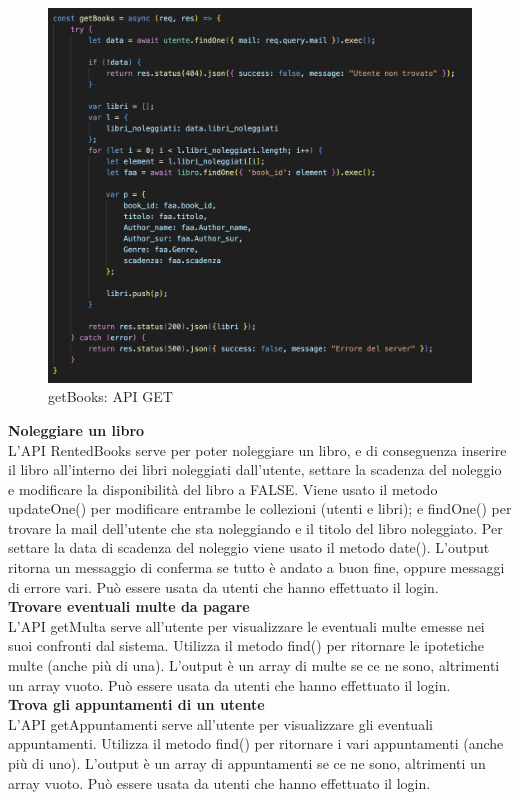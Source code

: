 \documentclass{article}
\begin{document}
\begin{figure}[H]
    \centering
    \includegraphics[width=120mm]{D4/Images/APIGet.png}
    \caption{getBooks: API GET}
\end{figure}

\noindent \textbf{Noleggiare un libro}\\
L'API RentedBooks serve per poter noleggiare un libro, e di conseguenza inserire il libro all'interno dei libri noleggiati dall'utente, settare la scadenza del noleggio e modificare la disponibilità del libro a FALSE.
Viene usato il metodo updateOne() per modificare entrambe le collezioni (utenti e libri); e findOne() per trovare la mail dell'utente che sta noleggiando e il titolo del libro noleggiato.
Per settare la data di scadenza del noleggio viene usato il metodo date(). L'output ritorna un messaggio di conferma se tutto è andato a buon fine, oppure messaggi di errore vari. Può essere usata da utenti che hanno effettuato il login.\\

\noindent \textbf{Trovare eventuali multe da pagare}\\
L'API getMulta serve all'utente per visualizzare le eventuali multe emesse nei suoi confronti dal sistema. Utilizza il metodo find() per ritornare le ipotetiche multe (anche più di una).
L'output è un array di multe se ce ne sono, altrimenti un array vuoto. Può essere usata da utenti che hanno effettuato il login.\\

\noindent \textbf{Trova gli appuntamenti di un utente}\\
L'API getAppuntamenti serve all'utente per visualizzare gli eventuali appuntamenti. Utilizza il metodo find() per ritornare i vari appuntamenti (anche più di uno).
L'output è un array di appuntamenti se ce ne sono, altrimenti un array vuoto. Può essere usata da utenti che hanno effettuato il login.\\
\end{document}
